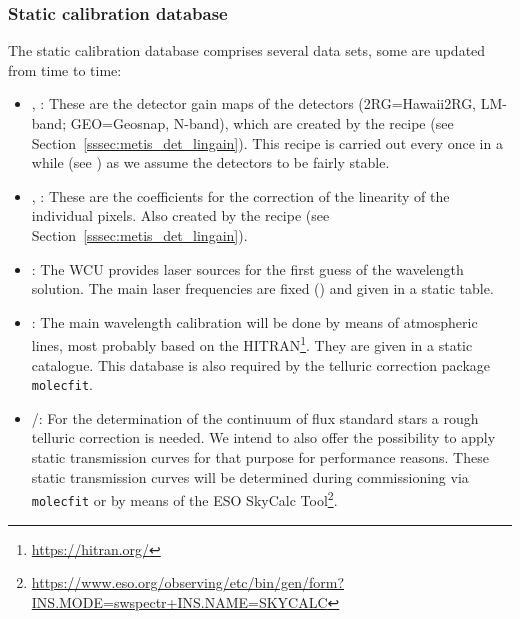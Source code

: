 \restoregeometry

\subsubsection{Static calibration database}\label{lss:static_calib}
The static calibration database comprises several data sets, some are updated from time to time:
\begin{itemize}
    \item \hyperref[dataitem:gain_map_2rg]{}, \hyperref[dataitem:gain_map_geo]{}: These are the detector gain maps of the detectors (2RG=Hawaii2RG, LM-band; GEO=Geosnap, N-band), which are created by the recipe \hyperref[sssec:metis_det_lingain]{} (see Section~\ref{sssec:metis_det_lingain}). This recipe is carried out every once in a while (see \cite{METIS-calibration_plan}) as we assume the detectors to be fairly stable.
    \item \hyperref[dataitem:linearity_2rg]{}, \hyperref[dataitem:linearity_geo]{}: These are the coefficients for the correction of the linearity of the individual pixels. Also created by the recipe \hyperref[sssec:metis_det_lingain]{} (see Section~\ref{sssec:metis_det_lingain}). 
    \item \hyperref[dataitem:laser_tab]{}: The \ac{WCU} provides laser sources for the first guess of the wavelength solution. The main laser frequencies are fixed (\cite{METIS-calibration_plan}) and given in a static table.
    \item \hyperref[dataitem:atm_line_cat]{}: The main wavelength calibration will be done by means of atmospheric lines, most probably based on the \ac{HITRAN}\footnote{\url{https://hitran.org/}}. They are given in a static catalogue. This database is also required by the telluric correction package \texttt{molecfit}.
    \item \hyperref[dataitem:lm_synth_trans]{}/\hyperref[dataitem:n_synth_trans]{}: For the determination of the continuum of flux standard stars a rough telluric correction is needed. We intend to also offer the possibility to apply static transmission curves for that purpose for performance reasons. These static transmission curves will be determined during commissioning via \texttt{molecfit} or by means of the ESO SkyCalc Tool\footnote{\url{https://www.eso.org/observing/etc/bin/gen/form?INS.MODE=swspectr+INS.NAME=SKYCALC}}.

\end{itemize}
